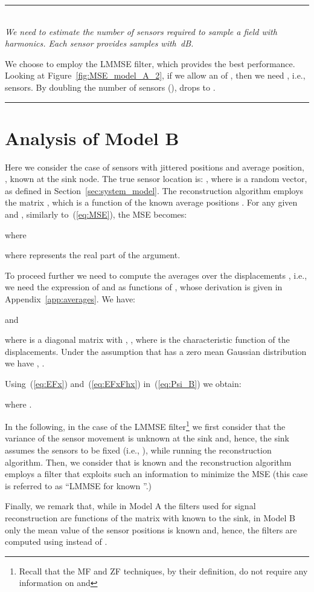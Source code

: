 \documentclass[final, a4paper]{IEEEtran}
\newcommand{\example}[2]{
\begin{center}
\parbox{0.95\columnwidth}{
\rule{0.95\columnwidth}{0.5mm}\\
\noindent {\bf Example~#1:}
#2\\
\rule{0.95\columnwidth}{0.5mm}
}
\end{center}
}
\begin{document}
\medskip
\example{1}{{\it We need to estimate the number of sensors required
to sample a field with  harmonics. Each sensor provides
samples with \,dB.}

We choose to employ the LMMSE filter, which provides the best
performance.
Looking at Figure~\ref{fig:MSE_model_A_2}, if we allow an
 of , then we need , i.e.,  sensors.
By doubling the number of sensors (),  drops to .
}


\section{Analysis of Model B}
\label{sec:model_C}

Here we consider the case of sensors with jittered positions and average position,
, known at the sink node.
The true sensor location is: , where  is a random vector,
as defined in Section~\ref{sec:system_model}.
The reconstruction algorithm employs the matrix , which is a
function of the known average positions . For any given  and
, similarly to~(\ref{eq:MSE}), the MSE becomes:

where

where  represents the real part of the argument.

To proceed further we need to compute the averages over the
displacements , i.e.,  we need the expression of
 and
 as functions of
, whose derivation is given in
Appendix~\ref{app:averages}. We have:

and

where  is a  diagonal matrix with
, , where
 is the characteristic function of the
displacements. Under the assumption that  has a zero mean
Gaussian distribution we have , .



Using~(\ref{eq:EFx}) and~(\ref{eq:EFxFhx}) in~(\ref{eq:Psi_B}) we obtain:

where .

In the following, in the case of the LMMSE filter\footnote{Recall that
the MF and ZF techniques, by their definition,
do not require any information on   and }
we first consider that the variance
 of the sensor movement is unknown at the sink
and, hence, the sink  assumes the sensors to be fixed (i.e.,
), while running the reconstruction algorithm. Then,
we consider that  is known and the reconstruction
algorithm employs a filter that exploits such an information to
minimize the MSE (this case is referred to as ``LMMSE for known
''.)

Finally, we remark that, while in Model A the filters used for
signal reconstruction are functions of the matrix  with
 known to the sink, in Model B only the mean value of the
sensor positions  is known and, hence, the filters are
computed using  instead of  .
\end{document}
